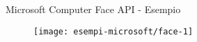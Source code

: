 %
\begin{frame}[t]{Microsoft Computer Face API - Esempio}
	\begin{figure}[h]
	\centering
	    \texttt{[image: esempi-microsoft/face-1]}
		\label{fig:esempio-microsoft-face}
	\end{figure}
\end{frame}
%
